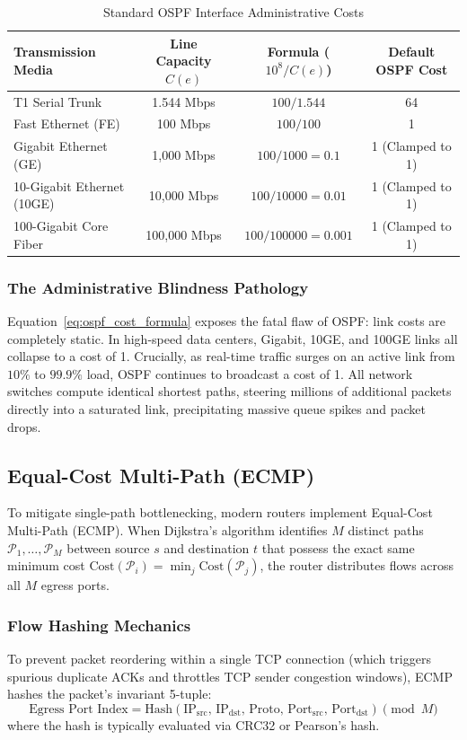 \begin{table}[htbp]
\centering
\caption{Standard OSPF Interface Administrative Costs}
\label{tab:ospf_costs}
\small
\begin{tabular}{l c c c}
\toprule
\textbf{Transmission Media} & \textbf{Line Capacity $C(e)$} & \textbf{Formula ($10^8 / C(e)$)} & \textbf{Default OSPF Cost} \\
\midrule
T1 Serial Trunk & 1.544 Mbps & $100 / 1.544$ & 64 \\
Fast Ethernet (FE) & 100 Mbps & $100 / 100$ & 1 \\
Gigabit Ethernet (GE) & 1,000 Mbps & $100 / 1000 = 0.1$ & 1 (Clamped to 1) \\
10-Gigabit Ethernet (10GE) & 10,000 Mbps & $100 / 10000 = 0.01$ & 1 (Clamped to 1) \\
100-Gigabit Core Fiber & 100,000 Mbps & $100 / 100000 = 0.001$ & 1 (Clamped to 1) \\
\bottomrule
\end{tabular}
\end{table}

\subsubsection{The Administrative Blindness Pathology}
Equation~\ref{eq:ospf_cost_formula} exposes the fatal flaw of OSPF: link costs are completely static. In high-speed data centers, Gigabit, 10GE, and 100GE links all collapse to a cost of 1. Crucially, as real-time traffic surges on an active link from $10\%$ to $99.9\%$ load, OSPF continues to broadcast a cost of 1. All network switches compute identical shortest paths, steering millions of additional packets directly into a saturated link, precipitating massive queue spikes and packet drops.

\subsection{Equal-Cost Multi-Path (ECMP)}
To mitigate single-path bottlenecking, modern routers implement Equal-Cost Multi-Path (ECMP). When Dijkstra's algorithm identifies $M$ distinct paths $\mathcal{P}_1, \dots, \mathcal{P}_M$ between source $s$ and destination $t$ that possess the exact same minimum cost $\text{Cost}(\mathcal{P}_i) = \min_j \text{Cost}(\mathcal{P}_j)$, the router distributes flows across all $M$ egress ports.

\subsubsection{Flow Hashing Mechanics}
To prevent packet reordering within a single TCP connection (which triggers spurious duplicate ACKs and throttles TCP sender congestion windows), ECMP hashes the packet's invariant 5-tuple:
\begin{equation}
    \text{Egress Port Index} = \text{Hash}(\text{IP}_{\text{src}}, \, \text{IP}_{\text{dst}}, \, \text{Proto}, \, \text{Port}_{\text{src}}, \, \text{Port}_{\text{dst}}) \pmod M
\end{equation}
where the hash is typically evaluated via CRC32 or Pearson's hash.

